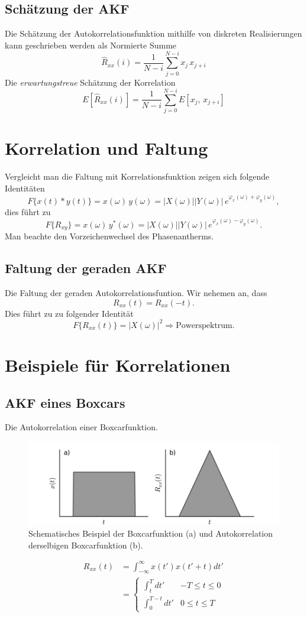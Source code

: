 \subsection{Schätzung der AKF}
Die Schätzung der Autokorrelationsfunktion mithilfe von diskreten Realisierungen kann geschrieben werden als Normierte Summe
\[
\hat R_{xx}(i) = \frac{1}{N-i} \sum_{j=0}^{N-i} x_j\,x_{j+i}
\]
Die \textit{erwartungstreue} Schätzung der Korrelation
\[
E[\hat R_{xx}(i)] = \frac{1}{N-i} \sum_{j=0}^{N-i} E[x_j,\,x_{j+i}]
\]

\section{Korrelation und Faltung}
Vergleicht man die Faltung mit Korrelationsfunktion zeigen sich folgende Identitäten
\[
F\{x(t) \ast y(t)\} = x(\omega)\,y(\omega) = |X(\omega)| |Y(\omega)|\,e^{\varphi_x(\omega) + \varphi_y(\omega)},
\]
dies führt zu
\[
F\{R_{xy}\} = x(\omega)\,y^*(\omega) = |X(\omega)| |Y(\omega)|\,e^{\varphi_x(\omega) - \varphi_y(\omega)}.
\]
Man beachte den Vorzeichenwechsel des Phasenantherms.

\subsection*{Faltung der geraden AKF}
Die Faltung der geraden Autokorrelationsfuntion. Wir nehemen an, dass
\[
R_{xx}(t) = R_{xx}(-t).
\]
Dies führt zu zu folgender Identität
\[
F\{R_{xx}(t)\} = |X(\omega)|^2 \Rightarrow \textrm{Powerspektrum}.
\]

\section{Beispiele für Korrelationen}

\subsection*{AKF eines Boxcars}
Die Autokorrelation einer Boxcarfunktion.
\begin{figure}[h!]
\centering
\includegraphics[width=.9\tw]{fig/09-Korrelation/01-example_boxcar.png}
\caption{Schematisches Beispiel der Boxcarfunktion (a) und Autokorrelation derselbigen Boxcarfunktion (b).}
\end{figure}
\begin{align*}
R_{xx}(t) & = \int_{-\infty}^\infty x(t') x(t'+t) dt' \\
& = \begin{cases}
 \int_t^T dt' & -T \leq t \leq 0\\
 \int_0^{T-t} dt' & 0  \leq t \leq T\
 \end{cases}
\end{align*}


